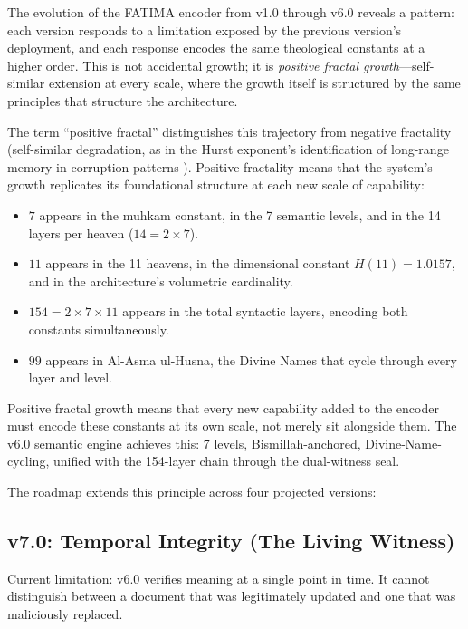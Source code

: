 \documentclass[11pt,a4paper]{article}
\begin{document}
The evolution of the FATIMA encoder from v1.0 through v6.0 reveals a pattern: each version responds to a limitation exposed by the previous version's deployment, and each response encodes the same theological constants at a higher order. This is not accidental growth; it is \textit{positive fractal growth}---self-similar extension at every scale, where the growth itself is structured by the same principles that structure the architecture.

The term ``positive fractal'' distinguishes this trajectory from negative fractality (self-similar degradation, as in the Hurst exponent's identification of long-range memory in corruption patterns \cite{arfeen2026signal}). Positive fractality means that the system's growth replicates its foundational structure at each new scale of capability:

\begin{itemize}[nosep]
    \item $7$ appears in the muhkam constant, in the 7 semantic levels, and in the 14 layers per heaven ($14 = 2 \times 7$).
    \item $11$ appears in the 11 heavens, in the dimensional constant $H(11) = 1.0157$, and in the architecture's volumetric cardinality.
    \item $154 = 2 \times 7 \times 11$ appears in the total syntactic layers, encoding both constants simultaneously.
    \item $99$ appears in Al-Asma ul-Husna, the Divine Names that cycle through every layer and level.
\end{itemize}

Positive fractal growth means that every new capability added to the encoder must encode these constants at its own scale, not merely sit alongside them. The v6.0 semantic engine achieves this: 7 levels, Bismillah-anchored, Divine-Name-cycling, unified with the 154-layer chain through the dual-witness seal.

The roadmap extends this principle across four projected versions:

\subsection{v7.0: Temporal Integrity (The Living Witness)}

Current limitation: v6.0 verifies meaning at a single point in time. It cannot distinguish between a document that was legitimately updated and one that was maliciously replaced.
\end{document}
